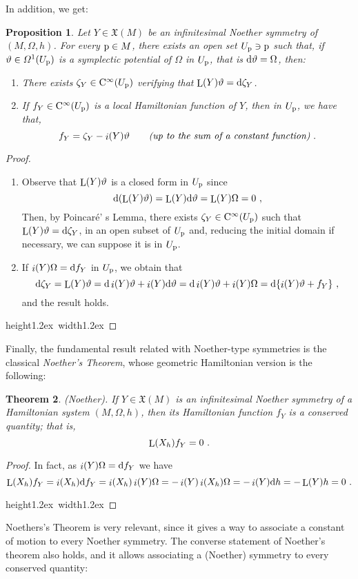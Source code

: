 \documentclass[12pt]{report}
\newtheorem{teor}{Theorem}[chapter]
\newtheorem{prop}[teor]{Proposition}
\def\beq{\begin{equation}}
\def\eeq{\end{equation}}
\def\ben{\begin{enumerate}}
\def\een{\end{enumerate}}
\def\qed{\ifvmode\removelastskip\fi
{\unskip\nobreak\hfil\penalty50\hbox{}\nobreak\hfil
\hbox{\vrule height1.2ex width1.2ex}\parfillskip=0pt
\finalhyphendemerits=0 \par\smallskip}}
\def\vf{\mathfrak X}
\def\df{{\mit\Omega}}
\def\d{{\rm d}}
\def\Lie{\mathop{\rm L}\nolimits}
\def\inn{\mathop{i}\nolimits}
\def\Cinfty{{\rm C}^\infty}
\begin{document}
In addition, we get:

\begin{prop}
Let $Y\in\vf(M)$ be an infinitesimal Noether symmetry of $(M,\Omega,h)$.
For every ${\rm p}\in M$, there exists an open set $U_{\rm p}\ni {\rm p}$ such that,
if $\vartheta\in\df^1(U_{\rm p})$ is a symplectic potential of $\Omega$
 in $U_{\rm p}$, that is $\d\vartheta=\Omega$, then:
\ben
\item
There exists $\zeta_Y\in\Cinfty(U_{\rm p})$ verifying that 
$\Lie(Y)\vartheta=\d\zeta_Y$.
\item
If $f_Y\in\Cinfty(U_{\rm p})$ is a local Hamiltonian function of $Y$, then
in $U_{\rm p}$, we have that,
\beq
f_Y=\zeta_Y-\inn(Y)\vartheta
\qquad \mbox{\it (up to the sum of a constant function)} \ .
\label{fdos}
\eeq
\een
\label{structure}
\end{prop}
\begin{proof}
\ben
\item
Observe that $\Lie(Y)\vartheta$ is a closed form in $U_{\rm p}$ since
$$
\d(\Lie(Y)\vartheta)=\Lie(Y)\d\vartheta=\Lie(Y)\Omega=0 \ ,
$$
Then, by Poincar\'e' s Lemma, 
there exists $\zeta_Y\in\Cinfty(U_{\rm p})$
such that $\Lie(Y)\vartheta=\d\zeta_Y$, in an open subset of $U_{\rm p}$ and, reducing the initial domain if necessary, we can suppose it is in $U_{\rm p}$.
\item
If $\inn(Y)\Omega=\d f_Y$ in $U_{\rm p}$, we obtain that
$$
\d\zeta_Y=\Lie(Y)\vartheta=\d\inn(Y)\vartheta+\inn(Y)\d\vartheta=
\d\inn(Y)\vartheta+\inn(Y)\Omega=\d \{\inn(Y)\vartheta+f_Y\} \ ,
 $$
and the result holds.
\een
\qed  \end{proof}

 Finally, the fundamental result related with Noether-type symmetries 
is the classical {\sl Noether's Theorem}, whose geometric Hamiltonian version is the following:

\begin{teor}
{\rm (Noether)}.
If $Y\in\vf (M)$ is an infinitesimal Noether symmetry of a Hamiltonian system $(M,\Omega,h)$, then
its Hamiltonian function $f_Y$
is a conserved quantity; that is, $$\Lie (X_h)f_Y=0 \ .$$
\label{Nth}
\end{teor}
\begin{proof}
In fact, as $\inn(Y)\Omega=\d f_Y$ we have
$$
\Lie(X_h)f_Y =
\inn(X_h)\d f_Y = \inn(X_h)\inn(Y)\Omega=
-\inn(Y)\inn(X_h)\Omega = -\inn(Y)\d h= -\Lie(Y) h=0 \ .
$$
\qed  \end{proof}

Noethers's Theorem is very relevant, since it gives a way to associate
a constant of motion to every Noether symmetry.
The converse statement of Noether's theorem also holds, and it
allows associating a (Noether) symmetry to every conserved quantity:
\end{document}
